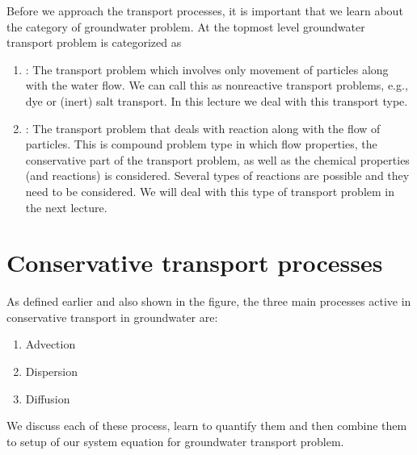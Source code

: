 \documentclass[letterpaper,10pt,english]{jupyterBook}
\begin{document}
\sphinxAtStartPar
{}

\sphinxAtStartPar
Before we approach the transport processes, it is important that we learn about the category of groundwater problem. At the top\sphinxhyphen{}most level groundwater transport problem is categorized as
\begin{enumerate}
%
\item {} 
\sphinxAtStartPar
{}: The transport problem which involves only movement of particles along with the water flow. We can call this as non\sphinxhyphen{}reactive transport problems, e.g., dye or (inert) salt transport. In this lecture we deal with this transport type.

\item {} 
\sphinxAtStartPar
{}: The transport problem that deals with reaction along with the flow of particles. This is compound problem type in which flow properties, the conservative part of the transport problem, as well as the chemical properties (and reactions) is considered. Several types of reactions are possible and they need to be considered. We will deal with this type of transport problem in the next lecture.

\end{enumerate}


\section{Conservative transport processes}
\label{\detokenize{content/transport/L9/21_conservative_transport:conservative-transport-processes}}
\sphinxAtStartPar
As defined earlier and also shown in the figure, the three main processes active in conservative transport in groundwater are:
\begin{enumerate}
%
\item {} 
\sphinxAtStartPar
Advection

\item {} 
\sphinxAtStartPar
Dispersion

\item {} 
\sphinxAtStartPar
Diffusion

\end{enumerate}

\sphinxAtStartPar
We discuss each of these process, learn to quantify them and then combine them to set\sphinxhyphen{}up of our system equation for groundwater transport problem.
\end{document}

